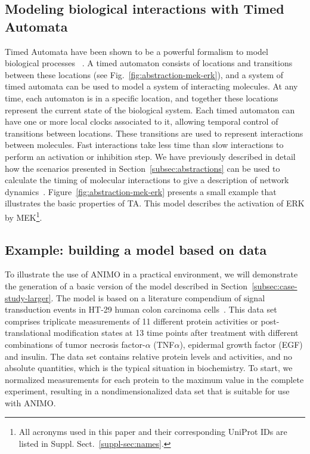 \documentclass{bmcart}
\def\ta{Timed Automaton}
\def\tas{Timed Automata}
\begin{document}
\subsection*{Modeling biological interactions with Timed Automata}\label{subsec:timed-automata}
\def\ta{TA}
\def\tas{TA}

Timed Automata have been shown to be a powerful formalism to model biological processes
~\cite{ta-siebert,bartocci-oscillators,oded-ode-ta-discretization}. A timed automaton consists of locations
and transitions between these locations (see Fig.~\ref{fig:abstraction-mek-erk}), and a system of timed automata can be
used to model a system of interacting molecules. At any time, each automaton is in a specific location, and together
these locations represent the current state of the biological system. Each timed automaton can have one or more local clocks
associated to it, allowing temporal control of transitions between locations. These transitions are used to
represent interactions between molecules. Fast interactions take less time than slow interactions
to perform an activation or inhibition step. We have previously described in detail how the
scenarios presented in Section~\ref{subsec:abstractions} can be used to calculate the timing of molecular
interactions to give a description of network dynamics~\cite{animo-ieee}. Figure~\ref{fig:abstraction-mek-erk}
presents a small example that illustrates the basic properties of \tas.
This model describes the activation of ERK by MEK\footnote{All acronyms used in this paper
and their corresponding UniProt IDs are listed in Suppl. Sect.~\ref{suppl-sec:names}.}.



\subsection*{Example: building a model based on data}\label{subsec:case-study}
To illustrate the use of ANIMO in a practical environment, we will demonstrate the generation of a basic
version of the model described in Section~\ref{subsec:case-study-larger}. The model is based on a literature compendium of
signal transduction events in HT-29 human colon carcinoma cells~\cite{pathway-compendium}. This data set comprises triplicate
measurements of 11 different protein activities or post-translational modification states at 13 time points after
treatment with different combinations of tumor necrosis factor-$\alpha$ (TNF$\alpha$), epidermal growth factor (EGF) and insulin.
The data set contains relative protein levels and activities, and no absolute quantities, which is the typical situation in biochemistry.
To start, we normalized measurements for each protein to the
maximum value in the complete experiment, resulting in a nondimensionalized data set that is suitable for use with ANIMO.
\end{document}
